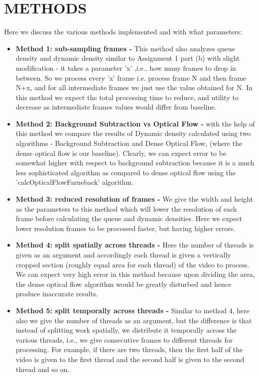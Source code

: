 \documentclass[paper=a4, fontsize = 12pt]{scrartcl}
\numberwithin{equation}{section}		%
\numberwithin{figure}{section}			%
\numberwithin{table}{section}				%
\begin{document}
\section{METHODS}
Here we discuss the various methods implemented and with what parameters:
\begin{itemize}
    \item \textbf{Method 1: sub-sampling frames -} This method also analyzes queue density and dynamic density similar to Assignment 1 part (b) with slight modification - it takes a parameter 'x' ,i.e., how many frames to drop in between. So we process every 'x' frame i.e. process frame N and then frame N+x, and for all intermediate frames we just use the value obtained for N. In this method we expect the total processing time to reduce, and utility to decrease as intermediate frames values would differ from baseline.
    
    \item \textbf{Method 2: Background Subtraction vs Optical Flow -} with the help of this method we compare the results of Dynamic density calculated using two algorithms - Background Subtraction and Dense Optical Flow, (where the dense optical flow is our baseline). Clearly, we can expect error to be somewhat higher with respect to background subtraction because it is a much less sophisticated algorithm as compared to dense optical flow using the 'calcOpticalFlowFarneback' algorithm.
    
    \item \textbf{Method 3: reduced resolution of frames -} We give the width and height as the parameters to this method which will lower the resolution of each frame before calculating the queue and dynamic densities. Here we expect lower resolution frames to be processed faster, but having higher errors.
    
    \item \textbf{Method 4: split spatially across threads -} Here the number of threads is given as an argument and accordingly each thread is given a vertically cropped section (roughly equal area for each thread) of the video to process. We can expect very high error in this method because upon dividing the area, the dense optical flow algorithm would be greatly disturbed and hence produce inaccurate results.
    
    \item \textbf{Method 5: split temporally across threads -} Similar to method 4, here also we give the number of threads as an argument, but the difference is that instead of splitting work spatially, we distribute it temporally across the various threads, i.e., we give consecutive frames to different threads for processing. For example, if there are two threads, then the first half of the video is given to the first thread and the second half is given to the second thread and so on.

\end{itemize}
\end{document}
